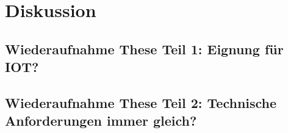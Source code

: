 \chapter{Diskussion}
\label{ch:discussion}


%
%
\section{Wiederaufnahme These Teil 1: Eignung für IOT?}
\label{sec:discussion:part1}


%
%
\section{Wiederaufnahme These Teil 2: Technische Anforderungen immer gleich?}
\label{sec:discussion:part2}
